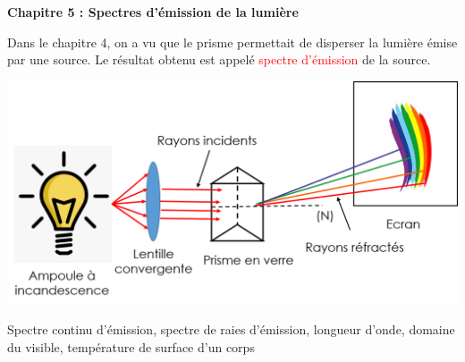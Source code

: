 \modeCorrection

\renewcommand{\thesubsection}{\textcolor{red}{\Roman{section}.\arabic{subsection}}}
\renewcommand{\thesubsubsection}{\textcolor{red}{\Roman{section}.\arabic{subsection}.\alph{subsubsection}}}

\setcounter{section}{0}
\sndEnTeteCoursCinq

\begin{mdframed}[style=titr, leftmargin=60pt, rightmargin=60pt, innertopmargin=7pt, innerbottommargin=7pt, innerrightmargin=8pt, innerleftmargin=8pt]

\begin{center}
\large{\textbf{Chapitre 5 : Spectres d'émission de la lumière}}
\end{center}
\end{mdframed}
Dans le chapitre 4, on a vu que le prisme permettait de disperser la lumière émise par une source. Le résultat obtenu est appelé \textcolor{red}{spectre d'émission} de la source. 

\begin{center}
    \includegraphics[scale=0.5]{Images/Montage.png}
\end{center}

\begin{tcolorbox}[colback=blue!5!white,colframe=blue!75!black,title=Mots clés du chapitre :]
Spectre continu d'émission, spectre de raies d'émission, longueur d'onde, domaine du visible, température de surface d'un corps 
\end{tcolorbox}


